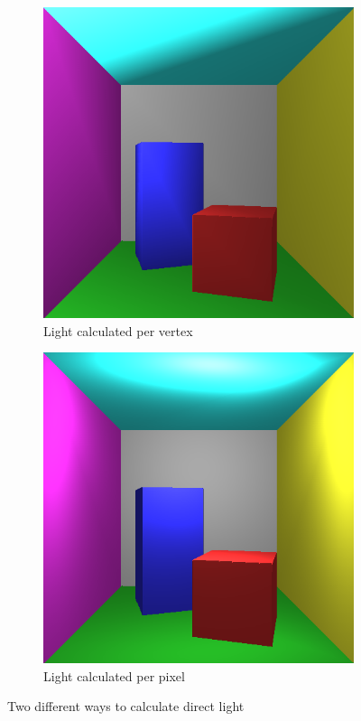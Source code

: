\documentclass[a4paper,11pt]{article}
\begin{document}
\begin{figure}[h!]
	\centering
	\begin{subfigure}[h]{0.3\linewidth}
		\centering
		\includegraphics[width=\linewidth]{screenshot3.png}
		\caption{Light calculated per vertex}
		\label{fig3}
	\end{subfigure}
	\begin{subfigure}[h!]{0.3\linewidth}
		\centering
		\includegraphics[width=\linewidth]{screenshot4.png}
		\caption{Light calculated per pixel}
		\label{fig4}
	\end{subfigure}
	\caption{Two different ways to calculate direct light}
\end{figure} 
\end{document}
